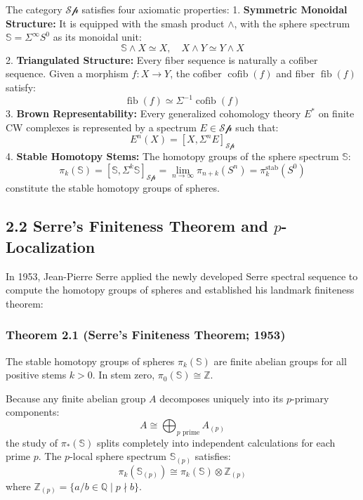 \documentclass[11pt,twoside,openright]{amsbook}
\begin{document}
{{The category $\mathcal{Sp}$ satisfies four axiomatic properties:
1. \textbf{Symmetric Monoidal Structure:} It is equipped with the smash product $\wedge$, with the sphere spectrum $\mathbb{S} = \Sigma^\infty S^0$ as its monoidal unit:
   $$\mathbb{S} \wedge X \simeq X, \quad X \wedge Y \simeq Y \wedge X$$
2. \textbf{Triangulated Structure:} Every fiber sequence is naturally a cofiber sequence. Given a morphism $f: X \to Y$, the cofiber $\operatorname{cofib}(f)$ and fiber $\operatorname{fib}(f)$ satisfy:
   $$\operatorname{fib}(f) \simeq \Sigma^{-1} \operatorname{cofib}(f)$$
3. \textbf{Brown Representability:} Every generalized cohomology theory $E^*$ on finite CW complexes is represented by a spectrum $E \in \mathcal{Sp}$ such that:
   $$E^n(X) = [X, \Sigma^n E]_{\mathcal{Sp}}$$
4. \textbf{Stable Homotopy Stems:} The homotopy groups of the sphere spectrum $\mathbb{S}$:
   $$\pi_k(\mathbb{S}) = [\mathbb{S}, \Sigma^k \mathbb{S}]_{\mathcal{Sp}} = \lim_{n \to \infty} \pi_{n+k}(S^n) = \pi_k^{\mathrm{stab}}(S^0)$$
   constitute the stable homotopy groups of spheres.

\subsection{2.2 Serre's Finiteness Theorem and $p$-Localization}
In 1953, Jean-Pierre Serre applied the newly developed Serre spectral sequence to compute the homotopy groups of spheres and established his landmark finiteness theorem:

\subsubsection{Theorem 2.1 (Serre's Finiteness Theorem; 1953)}
The stable homotopy groups of spheres $\pi_k(\mathbb{S})$ are finite abelian groups for all positive stems $k > 0$. In stem zero, $\pi_0(\mathbb{S}) \cong \mathbb{Z}$.

Because any finite abelian group $A$ decomposes uniquely into its $p$-primary components:
$$A \cong \bigoplus_{p \text{ prime}} A_{(p)}$$
the study of $\pi_*(\mathbb{S})$ splits completely into independent calculations for each prime $p$.
The $p$-local sphere spectrum $\mathbb{S}_{(p)}$ satisfies:
$$\pi_k(\mathbb{S}_{(p)}) \cong \pi_k(\mathbb{S}) \otimes \mathbb{Z}_{(p)}$$
where $\mathbb{Z}_{(p)} = \{a/b \in \mathbb{Q} \mid p \nmid b\}$.

}}
\end{document}
